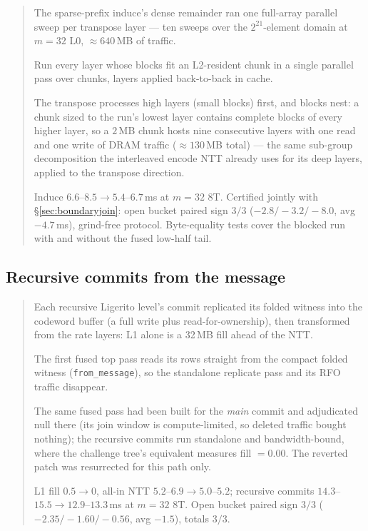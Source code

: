 \documentclass[11pt]{article}
\newcommand{\code}[1]{\texttt{#1}}
\newenvironment{optsummary}{%
  \begin{quote}\small
  \begin{description}
  \setlength{\itemsep}{1pt}\setlength{\parsep}{0pt}\setlength{\topsep}{2pt}
}{%
  \end{description}
  \end{quote}
}
\begin{document}
\begin{optsummary}
\item[Baseline:] The sparse-prefix induce's dense remainder ran one full-array parallel sweep per transpose layer --- ten sweeps over the $2^{21}$-element domain at $m{=}32$ L0, $\approx640\,$MB of traffic.
\item[Improvement:] Run every layer whose blocks fit an L2-resident chunk in a single parallel pass over chunks, layers applied back-to-back in cache.
\item[Mechanism:] The transpose processes high layers (small blocks) first, and blocks nest: a chunk sized to the run's lowest layer contains complete blocks of every higher layer, so a $2\,$MB chunk hosts nine consecutive layers with one read and one write of DRAM traffic ($\approx130\,$MB total) --- the same sub-group decomposition the interleaved encode NTT already uses for its deep layers, applied to the transpose direction.
\item[Result:] Induce $6.6$--$8.5\to5.4$--$6.7\,$ms at $m{=}32$ 8T. Certified jointly with \S\ref{sec:boundaryjoin}: open bucket paired sign $3/3$ ($-2.8/-3.2/-8.0$, avg $-4.7\,$ms), grind-free protocol. Byte-equality tests cover the blocked run with and without the fused low-half tail.
\end{optsummary}

\subsection{Recursive commits from the message}
\label{sec:recursivefill}

\begin{optsummary}
\item[Baseline:] Each recursive Ligerito level's commit replicated its folded witness into the codeword buffer (a full write plus read-for-ownership), then transformed from the rate layers: L1 alone is a 32\,MB fill ahead of the NTT.
\item[Improvement:] The first fused top pass reads its rows straight from the compact folded witness (\code{from\_message}), so the standalone replicate pass and its RFO traffic disappear.
\item[Mechanism:] The same fused pass had been built for the \emph{main} commit and adjudicated null there (its join window is compute-limited, so deleted traffic bought nothing); the recursive commits run standalone and bandwidth-bound, where the challenge tree's equivalent measures fill $= 0.00$. The reverted patch was resurrected for this path only.
\item[Result:] L1 fill $0.5\to0$, all-in NTT $5.2$--$6.9\to5.0$--$5.2$; recursive commits $14.3$--$15.5\to12.9$--$13.3\,$ms at $m{=}32$ 8T. Open bucket paired sign $3/3$ ($-2.35/-1.60/-0.56$, avg $-1.5$), totals $3/3$.
\end{optsummary}
\end{document}
